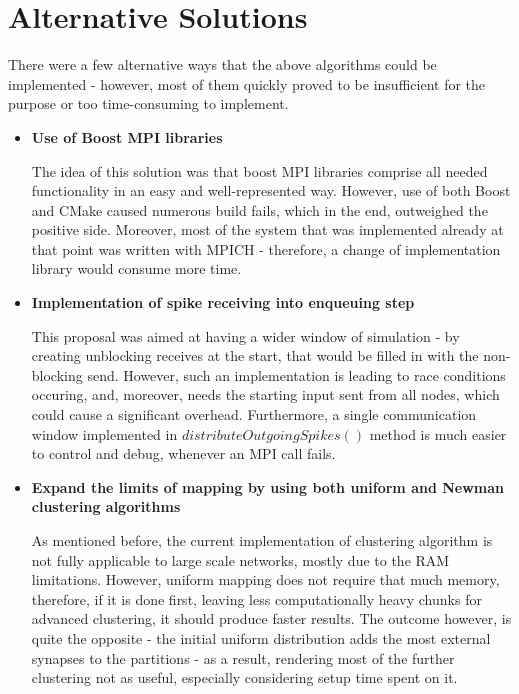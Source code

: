 \clearpage

\section{Alternative Solutions}

There were a few alternative ways that the above algorithms could be implemented - however, most of them quickly proved to be insufficient for the purpose or too time-consuming to implement.

\begin{itemize}
\item{\textbf{Use of Boost MPI libraries}}

The idea of this solution was that boost MPI libraries comprise all needed functionality in an easy and well-represented way. However, use of both Boost and CMake caused numerous build fails, which in the end, outweighed the positive side. Moreover, most of the system that was implemented already at that point was written with MPICH - therefore, a change of implementation library would consume more time.

\item{\textbf{Implementation of spike receiving into enqueuing step}}

This proposal was aimed at having a wider window of simulation - by creating unblocking receives at the start, that would be filled in with the non-blocking send. However, such an implementation is leading to race conditions occuring, and, moreover, needs the starting input sent from all nodes, which could cause a significant overhead. Furthermore, a single communication window implemented in $distributeOutgoingSpikes()$ method is much easier to control and debug, whenever an MPI call fails.

\item{\textbf{Expand the limits of mapping by using both uniform and Newman clustering algorithms}}

As mentioned before, the current implementation of clustering algorithm is not fully applicable to large scale networks, mostly due to the RAM limitations. However, uniform mapping does not require that much memory, therefore, if it is done first, leaving less computationally heavy chunks for advanced clustering, it should produce faster results. The outcome however, is quite the opposite - the initial uniform distribution adds the most external synapses to the partitions - as a result, rendering most of the further clustering not as useful, especially considering setup time spent on it.
\end{itemize}
